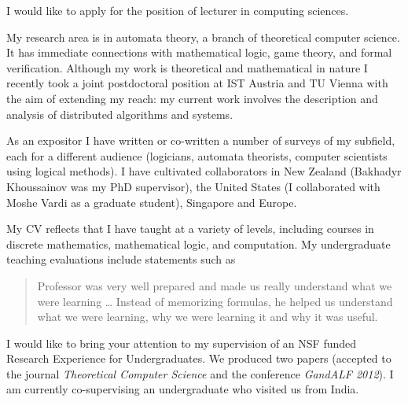 \documentclass{letter}
\begin{document}
\begin{letter}{}


\signature{\mbox{ }\\[-1.5 cm]Sasha Rubin\\\texttt{sasha.rubin@gmail.com}}

\opening{}

I would like to apply for the position of lecturer in computing sciences.


My research area is in automata theory, a branch of theoretical computer science. It has immediate connections with mathematical logic, game theory, and formal verification. Although my work is theoretical and mathematical in nature I recently took a joint postdoctoral position at IST Austria and TU Vienna with the aim of extending my reach: my current work involves the description and analysis of distributed algorithms and systems. 

As an expositor I have written or co-written a number of surveys of my subfield, each for a different audience (logicians, automata theorists, computer scientists using logical methods). I have cultivated collaborators in New Zealand (Bakhadyr Khoussainov was my PhD supervisor), the United States (I collaborated with Moshe Vardi as a graduate student), Singapore and Europe.

My CV reflects that I have taught at a variety of levels, including courses in discrete mathematics, mathematical logic, and computation. My undergraduate teaching evaluations include statements such as 
\begin{quote}
Professor was very well prepared and made us really understand what we were learning \dots 
Instead of memorizing formulas, he helped us understand what we were learning, why we
were learning it and why it was useful.
\end{quote}

I would like to bring your attention to my supervision of an NSF funded Research Experience for Undergraduates.
We produced two papers (accepted to the journal {\em Theoretical Computer Science} and the conference {\em GandALF 2012}).
I am currently co-supervising an undergraduate who visited us from India.


\end{letter}
\end{document}

